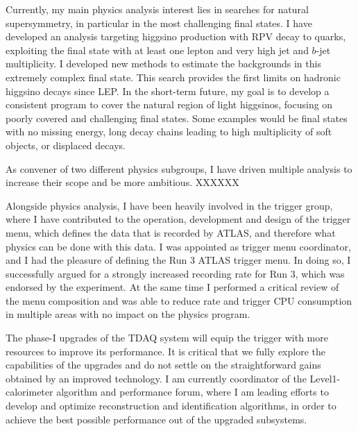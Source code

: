 \documentclass[11pt,a4paper,sans]{moderncv}        %
\begin{document}
Currently, my main physics analysis interest lies in searches for natural supersymmetry, in particular in the most challenging final states. 
I have developed an analysis targeting higgsino production with RPV decay to quarks, exploiting the final state with at least one lepton and very high jet and $b$-jet multiplicity. I developed new methods to estimate the backgrounds in this extremely complex final state. This search provides the first limits on hadronic higgsino decays since LEP. 
In the short-term future, my goal is to develop a consistent program to cover the natural region of light higgsinos, focusing on poorly covered and challenging final states. Some examples would be final states with no missing energy, long decay chains leading to high multiplicity of soft objects, or displaced decays. 
\newline

As convener of two different physics subgroups, I have driven multiple analysis to increase their scope and be more ambitious. XXXXXX
\newline


Alongside physics analysis, I have been heavily involved in the trigger group, where I have contributed to the operation, development and design of the trigger menu, which defines the data that is recorded by ATLAS, and therefore what physics can be done with this data. I was appointed as trigger menu coordinator, and I had the pleasure of defining the Run 3 ATLAS trigger menu. In doing so, I successfully argued for a strongly increased recording rate for Run 3, which was endorsed by the experiment. At the same time I performed a critical review of the menu composition and was able to reduce rate and trigger CPU consumption in multiple areas with no impact on the physics program.
\newline

The phase-I upgrades of the TDAQ system will equip the trigger with more resources to improve its performance. It is critical that we fully explore the capabilities of the upgrades and do not settle on the straightforward gains obtained by an improved technology. 
I am currently coordinator of the Level1-calorimeter algorithm and performance forum, where I am leading efforts to develop and optimize reconstruction and identification algorithms, in order to achieve the best possible performance out of the upgraded subsystems.
\newline
\end{document}
